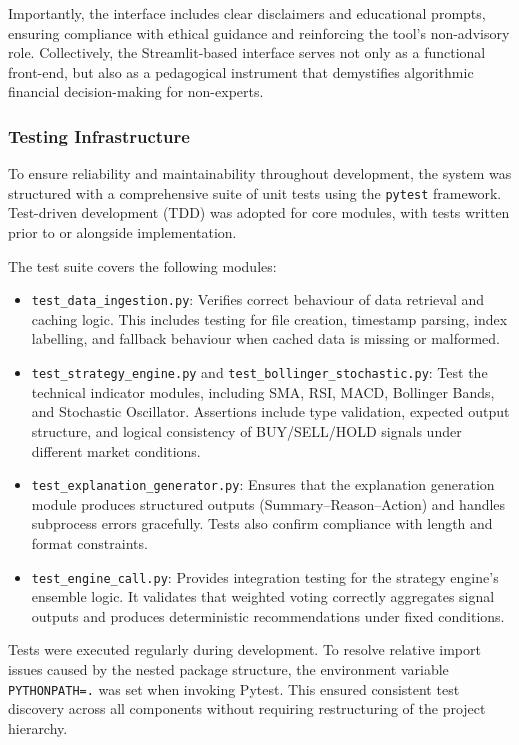 Importantly, the interface includes clear disclaimers and educational prompts, ensuring compliance with ethical guidance and reinforcing the tool’s non-advisory role. Collectively, the Streamlit-based interface serves not only as a functional front-end, but also as a pedagogical instrument that demystifies algorithmic financial decision-making for non-experts.


\subsubsection{Testing Infrastructure}

To ensure reliability and maintainability throughout development, the system was structured with a comprehensive suite of unit tests using the \texttt{pytest} framework. Test-driven development (TDD) was adopted for core modules, with tests written prior to or alongside implementation.

The test suite covers the following modules:

\begin{itemize}
    \item \texttt{test\_data\_ingestion.py}: Verifies correct behaviour of data retrieval and caching logic. This includes testing for file creation, timestamp parsing, index labelling, and fallback behaviour when cached data is missing or malformed.

    \item \texttt{test\_strategy\_engine.py} and \texttt{test\_bollinger\_stochastic.py}: Test the technical indicator modules, including SMA, RSI, MACD, Bollinger Bands, and Stochastic Oscillator. Assertions include type validation, expected output structure, and logical consistency of BUY/SELL/HOLD signals under different market conditions.

    \item \texttt{test\_explanation\_generator.py}: Ensures that the explanation generation module produces structured outputs (Summary–Reason–Action) and handles subprocess errors gracefully. Tests also confirm compliance with length and format constraints.

    \item \texttt{test\_engine\_call.py}: Provides integration testing for the strategy engine's ensemble logic. It validates that weighted voting correctly aggregates signal outputs and produces deterministic recommendations under fixed conditions.
\end{itemize}

Tests were executed regularly during development. To resolve relative import issues caused by the nested package structure, the environment variable \texttt{PYTHONPATH=.} was set when invoking Pytest. This ensured consistent test discovery across all components without requiring restructuring of the project hierarchy.

